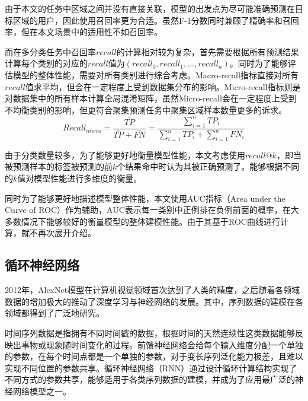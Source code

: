 \documentclass[master]{thesis-uestc}
\begin{document}
由于本文的任务中区域之间并没有直接关联，模型的出发点为尽可能准确预测在目标区域的用户，因此使用召回率更为合适。虽然F-1分数同时兼顾了精确率和召回率，但在本文场景中的适用性不如召回率。

而在多分类任务中召回率$recall$的计算相对较为复杂，首先需要根据所有预测结果计算每个类别的对应的$recall$值为$(recall_0,recall_1,\dots,recall_n)$。同时为了能够评估模型的整体性能，需要对所有类别进行综合考虑。Macro-recall指标直接对所有$recall$值求平均，但会在一定程度上受到数据集分布的影响。Micro-recall指标则是对数据集中的所有样本计算全局混淆矩阵，虽然Micro-recall会在一定程度上受到不均衡类别的影响，但更符合聚集预测任务中聚集区域样本数量更多的诉求。
\begin{equation}
   Recall_{micro}=\frac{\bar{TP}}{\bar{TP}+\bar{FN}} = \frac{\sum_{i=1}^n TP_i}{\sum_{i=1}^n TP_i+\sum_{i=1}^n FN_i}
\end{equation}

由于分类数量较多，为了能够更好地衡量模型性能，本文考虑使用$recall@k$，即当被预测样本的标签被预测的前$k$个结果命中时认为其被正确预测了。能够根据不同的$k$值对模型性能进行多维度的衡量。

同时为了能够更好地描述模型整体性能，本文使用AUC指标（Area under the Curve of ROC）作为辅助，AUC表示每一类别中正例排在负例前面的概率，在大多数情况下能够较好的衡量模型的整体建模性能。由于其基于ROC曲线进行计算，就不再次展开介绍。

\subsection{循环神经网络}
2012年，AlexNet模型在计算机视觉领域首次达到了人类的精度，之后随着各领域数据的增加极大的推动了深度学习与神经网络的发展。其中，序列数据的建模在各领域都得到了广泛地研究。

时间序列数据是指拥有不同时间戳的数据，根据时间的天然连续性这类数据能够反映出事物或现象随时间变化的过程。前馈神经网络会给每个输入维度分配一个单独的参数，在每个时间点都是一个单独的参数，对于变长序列泛化能力极差，且难以实现不同位置的参数共享。循环神经网络（RNN）通过设计循环计算结构实现了不同方式的参数共享，能够适用于各类序列数据的建模，并成为了应用最广泛的神经网络模型之一。
\end{document}
